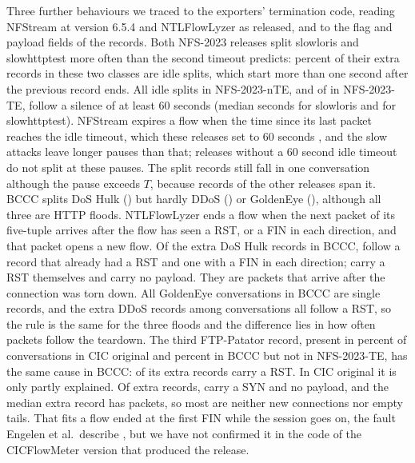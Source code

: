 \documentclass[pdflatex,sn-mathphys-num]{sn-jnl}
\newcommand{\setnum}[1]{#1}
\newcommand{\docnum}[1]{#1}
\theoremstyle{thmstyleone}%
\theoremstyle{thmstylethree}%
\begin{document}
Three further behaviours we traced to the exporters' termination code, reading NFStream at version \docnum{6.5.4} and NTLFlowLyzer as released, and to the flag and payload fields of the records. Both NFS-2023 releases split slowloris and slowhttptest more often than the \NactiveTimeout{} second timeout predicts: \RQoneIdleNfs{} percent of their extra records in these two classes are idle splits, which start more than one second after the previous record ends. All \RevIdleNte{} idle splits in NFS-2023-nTE, and \RevIdleTeSixty{} of \RevIdleTe{} in NFS-2023-TE, follow a silence of at least \setnum{60} seconds (median \RevIdleGapLoris{} seconds for slowloris and \RevIdleGapHttp{} for slowhttptest). NFStream expires a flow when the time since its last packet reaches the idle timeout, which these releases set to \setnum{60} seconds \cite{pekar2024}, and the slow attacks leave longer pauses than that; releases without a \setnum{60} second idle timeout do not split at these pauses. The split records still fall in one conversation although the pause exceeds $T$, because records of the other releases span it. BCCC splits DoS Hulk (\RQoneHulkBccc{}) but hardly DDoS (\RQoneDdosBccc{}) or GoldenEye (\RQoneGoldenBccc{}), although all three are HTTP floods. NTLFlowLyzer ends a flow when the next packet of its five-tuple arrives after the flow has seen a RST, or a FIN in each direction, and that packet opens a new flow. Of the \RevHulkExtra{} extra DoS Hulk records in BCCC, \RevHulkAfterRst{} follow a record that already had a RST and \RevHulkAfterFin{} one with a FIN in each direction; \RevHulkCarryRst{} carry a RST themselves and \RevHulkNoPay{} carry no payload. They are packets that arrive after the connection was torn down. All \RevGoldenConvs{} GoldenEye conversations in BCCC are single records, and the \RevDdosExtra{} extra DDoS records among \RevDdosConvs{} conversations all follow a RST, so the rule is the same for the three floods and the difference lies in how often packets follow the teardown. The third FTP-Patator record, present in \RQoneFtpThreeOrig{} percent of conversations in CIC original and \RQoneFtpThreeBccc{} percent in BCCC but not in NFS-2023-TE, has the same cause in BCCC: \RevFtpBcccExtraRst{} of its \RevFtpBcccExtra{} extra records carry a RST. In CIC original it is only partly explained. Of \RevFtpOrigExtra{} extra records, \RevFtpOrigSyn{} carry a SYN and \RevFtpOrigNoPay{} no payload, and the median extra record has \RevFtpOrigPk{} packets, so most are neither new connections nor empty tails. That fits a flow ended at the first FIN while the session goes on, the fault Engelen et al.\ describe \cite{engelen2021}, but we have not confirmed it in the code of the CICFlowMeter version that produced the release.
\end{document}
